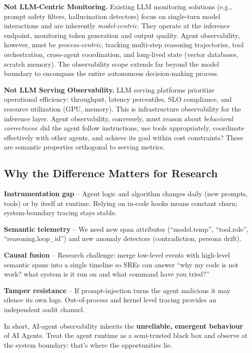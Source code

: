 \documentclass[sigplan,screen，review,9pt]{acmart}
\begin{document}
\textbf{Not LLM-Centric Monitoring.} Existing LLM monitoring solutions (e.g., prompt safety filters, hallucination detectors) focus on single-turn model interactions and are inherently \emph{model-centric}. They operate at the inference endpoint, monitoring token generation and output quality. Agent observability, however, must be \emph{process-centric}, tracking multi-step reasoning trajectories, tool orchestration, cross-agent coordination, and long-lived state (vector databases, scratch memory). The observability scope extends far beyond the model boundary to encompass the entire autonomous decision-making process.

\textbf{Not LLM Serving Observability.} LLM serving platforms prioritize operational efficiency: throughput, latency percentiles, SLO compliance, and resource utilization (GPU, memory). This is infrastructure observability for the inference layer. Agent observability, conversely, must reason about \emph{behavioral correctness}: did the agent follow instructions, use tools appropriately, coordinate effectively with other agents, and achieve its goal within cost constraints? These are semantic properties orthogonal to serving metrics.

\subsection{Why the Difference Matters for Research}

\textbf{Instrumentation gap} – Agent logic and algorithm changes daily (new prompts, tools) or by itself at runtime. Relying on in-code hooks means constant churn; system-boundary tracing stays stable.

\textbf{Semantic telemetry} – We need new span attributes (``model.temp'', ``tool.role'', ``reasoning.loop\_id'') and new anomaly detectors (contradiction, persona drift).

\textbf{Causal fusion} – Research challenge: merge low-level events with high-level semantic spans into a single timeline so SREs can answer ``why my code is not work? what system is it run on and what command have you tried?''

\textbf{Tamper resistance} – If prompt-injection turns the agent malicious it may silence its own logs. Out-of-process and kernel level tracing provides an independent audit channel.

In short, AI-agent observability inherits the \textbf{unreliable, emergent behaviour} of AI Agents. Treat the agent runtime as a semi-trusted black box and observe at the system boundary: that's where the opportunities lie.
\end{document}
